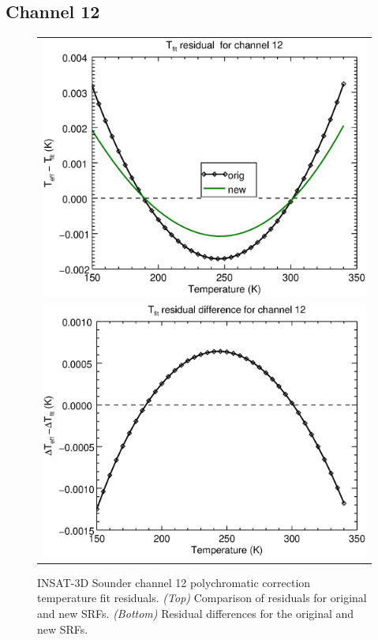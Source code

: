 \subsection{Channel 12}
\begin{figure}[H]
  \centering
  \begin{tabular}{c}
    \includegraphics[scale=0.55]{graphics/sndr/tfit/sndr_insat3d-12.tfit.eps} \\
    \includegraphics[scale=0.55]{graphics/sndr/tfit/sndr_insat3d-12.tfit.difference.eps}
  \end{tabular}
  \caption{INSAT-3D Sounder channel 12 polychromatic correction temperature fit residuals. \emph{(Top)} Comparison of residuals for original and new SRFs. \emph{(Bottom)} Residual differences for the original and new SRFs.}
  \label{fig:sndr_ch12_tfit}
\end{figure}


